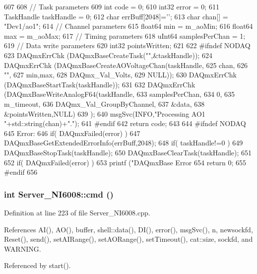 \begin{DoxyCode}
607                                  {
608   // Task parameters
609   int         code  = 0;
610   int32       error = 0;
611   TaskHandle  taskHandle = 0;
612   char        errBuff[2048]={'\0'};
613   char        chan[] = "Dev1/ao1";
614   // Channel parameters
615   float64     min = m_aoMin;
616   float64     max = m_aoMax;
617   // Timing parameters
618   uInt64      samplesPerChan = 1;
619   // Data write parameters
620   int32       pointsWritten;
621 
622   #ifndef NODAQ
623   DAQmxErrChk (DAQmxBaseCreateTask("",&taskHandle));
624   DAQmxErrChk (DAQmxBaseCreateAOVoltageChan(taskHandle,
625                         chan,
626                         "",
627                         min,max,
628                         DAQmx_Val_Volts,
629                         NULL));
630   DAQmxErrChk (DAQmxBaseStartTask(taskHandle));
631   
632   DAQmxErrChk (DAQmxBaseWriteAnalogF64(taskHandle,
633                        samplesPerChan,
634                        0,
635                        m_timeout,
636                        DAQmx_Val_GroupByChannel,
637                        &data,
638                        &pointsWritten,NULL)
639            );
640   msgSvc(INFO,"Processing AO1 "+std::string(chan)+".");
641 #endif
642   return code;
643 
644 #ifndef NODAQ
645 Error:
646     if( DAQmxFailed(error) )
647         DAQmxBaseGetExtendedErrorInfo(errBuff,2048);
648     if( taskHandle!=0 ) {
649         DAQmxBaseStopTask(taskHandle);
650         DAQmxBaseClearTask(taskHandle);
651     }
652     if( DAQmxFailed(error) )
653         printf ("DAQmxBase Error %
654     return 0;
655 #endif
656 }
\end{DoxyCode}
\hypertarget{classServer__NI6008_ac659132ba000bf628a5f5b696ae133ee}{
\subsubsection[{cmd}]{\setlength{\rightskip}{0pt plus 5cm}int Server\_\-NI6008::cmd ()}}
\label{classServer__NI6008_ac659132ba000bf628a5f5b696ae133ee}


Definition at line 223 of file Server\_\-NI6008.cpp.

References AI(), AO(), buffer, shell::data(), DI(), error(), msgSvc(), n, newsockfd, Reset(), send(), setAIRange(), setAORange(), setTimeout(), cat::size, sockfd, and WARNING.

Referenced by start().


